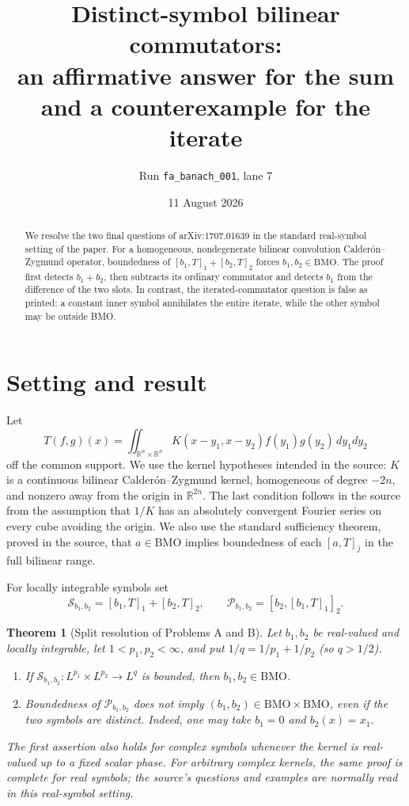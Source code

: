 \documentclass[11pt]{article}
\title{Distinct-symbol bilinear commutators:\\
an affirmative answer for the sum and a counterexample for the iterate}
\author{Run \texttt{fa\_banach\_001}, lane 7}
\date{11 August 2026}
\newtheorem{theorem}{Theorem}
\newcommand{\BMO}{\mathrm{BMO}}
\newcommand{\R}{\mathbb R}
\newcommand{\1}{\mathbf 1}
\begin{document}
\maketitle

\begin{abstract}
We resolve the two final questions of arXiv:1707.01639 in the standard
real-symbol setting of the paper.  For a homogeneous, nondegenerate bilinear
convolution Calder\'on--Zygmund operator, boundedness of
\([b_1,T]_1+[b_2,T]_2\) forces \(b_1,b_2\in\BMO\).  The proof first detects
\(b_1+b_2\), then subtracts its ordinary commutator and detects \(b_1\) from
the difference of the two slots.  In contrast, the iterated-commutator
question is false as printed: a constant inner symbol annihilates the entire
iterate, while the other symbol may be outside BMO.
\end{abstract}

\section{Setting and result}

Let
\[
 T(f,g)(x)=\iint_{\R^n\times\R^n}K(x-y_1,x-y_2)f(y_1)g(y_2)\,dy_1dy_2
\]
off the common support.  We use the kernel hypotheses intended in the source:
\(K\) is a continuous bilinear Calder\'on--Zygmund kernel, homogeneous of
degree \(-2n\), and nonzero away from the origin in \(\R^{2n}\).  The last
condition follows in the source from the assumption that \(1/K\) has an
absolutely convergent Fourier series on every cube avoiding the origin.  We
also use the standard sufficiency theorem, proved in the source, that
\(a\in\BMO\) implies boundedness of each \([a,T]_j\) in the full bilinear
range.

For locally integrable symbols set
\[
 \mathcal S_{b_1,b_2}=[b_1,T]_1+[b_2,T]_2,
 \qquad
 \mathcal P_{b_1,b_2}=[b_2,[b_1,T]_1]_2.
\]

\begin{theorem}[Split resolution of Problems A and B]
\label{thm:main}
Let \(b_1,b_2\) be real-valued and locally integrable, let
\(1<p_1,p_2<\infty\), and put
\(1/q=1/p_1+1/p_2\) (so \(q>1/2\)).
\begin{enumerate}
\item If
\(\mathcal S_{b_1,b_2}:L^{p_1}\times L^{p_2}\to L^q\) is bounded, then
\(b_1,b_2\in\BMO\).
\item Boundedness of \(\mathcal P_{b_1,b_2}\) does not imply
\((b_1,b_2)\in\BMO\times\BMO\), even if the two symbols are distinct.
Indeed, one may take \(b_1=0\) and \(b_2(x)=x_1\).
\end{enumerate}
The first assertion also holds for complex symbols whenever the kernel is
real-valued up to a fixed scalar phase.  For arbitrary complex kernels, the
same proof is complete for real symbols; the source's questions and examples
are normally read in this real-symbol setting.
\end{theorem}
\end{document}
